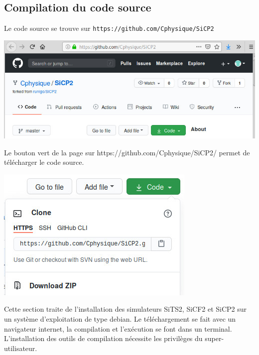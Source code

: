 \subsection{Compilation du code source}
%
Le code source se trouve sur \texttt{https://github.com/Cphysique/SiCP2}
%
\begin{center}
\includegraphics[width=.6\textwidth]{./presentation/CphysiqueSiCP2}
\end{center}
%
Le bouton vert de la page sur https://github.com/Cphysique/SiCP2/ permet de télécharger le code source.
%
\begin{center}
\includegraphics[width=.3\textwidth]{./presentation/CphysiqueSiCP2code}
\end{center}
%
Cette section traite de l'installation des simulateurs SiTS2, SiCF2 et SiCP2 sur un système d'exploitation de type debian. Le téléchargement se fait avec un navigateur internet, la compilation et l'exécution se font dans un terminal. L'installation des outils de compilation nécessite les privilèges du super-utilisateur.
